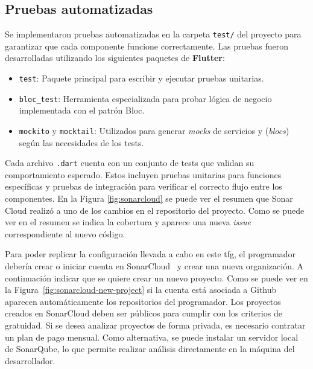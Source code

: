 \subsection{Pruebas automatizadas}

Se implementaron pruebas automatizadas en la carpeta \texttt{test/} del proyecto para garantizar que cada componente funcione correctamente. Las pruebas fueron desarrolladas utilizando los siguientes paquetes de \textbf{Flutter}:

\begin{itemize}
	\item \texttt{test}: Paquete principal para escribir y ejecutar pruebas unitarias.
	\item \texttt{bloc\_test}: Herramienta especializada para probar lógica de negocio implementada con el patrón Bloc.
	\item \texttt{mockito} y \texttt{mocktail}: Utilizados para generar \textit{mocks} de servicios y (\textit{blocs}) según las necesidades de los tests.
\end{itemize}

Cada archivo \texttt{.dart} cuenta con un conjunto de tests que validan su comportamiento esperado. Estos incluyen pruebas unitarias para funciones específicas y pruebas de integración para verificar el correcto flujo entre los componentes.
En la Figura \ref{fig:sonarcloud} se puede ver el resumen que Sonar Cloud realizó a uno de los cambios en el repositorio del proyecto.
Como se puede ver en el resumen se indica la cobertura y aparece una nueva \textit{issue} correspondiente al nuevo código.

Para poder replicar la configuración llevada a cabo en este \acrlong{tfg}, el programador debería crear o iniciar cuenta en SonarCloud~\cite{sonarcloud} y crear una nueva organización. A continuación indicar que se quiere crear un nuevo proyecto. Como se puede ver en la Figura~\ref{fig:sonarcloud-new-project} si la cuenta está asociada a Github aparecen automáticamente los repositorios del programador.
Los proyectos creados en SonarCloud deben ser públicos para cumplir con los criterios de gratuidad. Si se desea analizar proyectos de forma privada, es necesario contratar un plan de pago mensual. Como alternativa, se puede instalar un servidor local de SonarQube, lo que permite realizar análisis directamente en la máquina del desarrollador.

